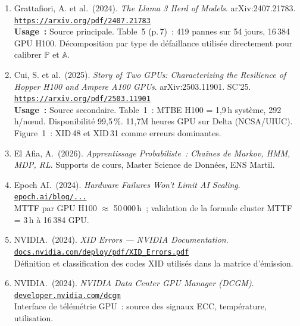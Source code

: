 \documentclass[12pt,a4paper]{article}
\begin{document}
\begin{enumerate}
  \item Grattafiori, A. et al.\ (2024).
        \textit{The Llama 3 Herd of Models}.
        arXiv:2407.21783.
        \href{https://arxiv.org/pdf/2407.21783}{\texttt{https://arxiv.org/pdf/2407.21783}}\\
        \textbf{Usage~:} Source principale. Table~5 (p.\,7)~: 419 pannes sur 54 jours,
        16\,384 GPU H100. Décomposition par type de défaillance utilisée directement
        pour calibrer $\mathbb{P}$ et $\mathbb{A}$.

  \item Cui, S. et al.\ (2025).
        \textit{Story of Two GPUs: Characterizing the Resilience of Hopper H100 and Ampere A100 GPUs}.
        arXiv:2503.11901. SC'25.
        \href{https://arxiv.org/pdf/2503.11901}{\texttt{https://arxiv.org/pdf/2503.11901}}\\
        \textbf{Usage~:} Source secondaire. Table~1~: MTBE H100 = 1,9\,h système,
        292\,h/nœud. Disponibilité 99,5\,\%. 11,7M heures GPU sur Delta (NCSA/UIUC).
        Figure~1~: XID\,48 et XID\,31 comme erreurs dominantes.

  \item El Afia, A.\ (2026).
        \textit{Apprentissage Probabiliste~: Chaînes de Markov, HMM, MDP, RL}.
        Supports de cours, Master Science de Données, ENS Martil.

  \item Epoch AI.\ (2024).
        \textit{Hardware Failures Won't Limit AI Scaling}.
        \href{https://epoch.ai/blog/hardware-failures-wont-limit-ai-scaling}{\texttt{epoch.ai/blog/...}}\\
        MTTF par GPU H100 $\approx$ 50\,000\,h~; validation de la formule cluster MTTF = 3\,h
        à 16\,384 GPU.

  \item NVIDIA.\ (2024).
        \textit{XID Errors --- NVIDIA Documentation}.
        \href{https://docs.nvidia.com/deploy/pdf/XID_Errors.pdf}{\texttt{docs.nvidia.com/deploy/pdf/XID\_Errors.pdf}}\\
        Définition et classification des codes XID utilisés dans la matrice d'émission.

  \item NVIDIA.\ (2024).
        \textit{NVIDIA Data Center GPU Manager (DCGM)}.
        \href{https://developer.nvidia.com/dcgm}{\texttt{developer.nvidia.com/dcgm}}\\
        Interface de télémétrie GPU~: source des signaux ECC, température, utilisation.


\end{enumerate}
\end{document}
